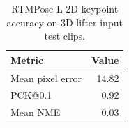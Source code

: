\begin{table}[t]
\centering
\caption{RTMPose-L 2D keypoint accuracy on 3D-lifter input test clips.}
\begin{tabular}{lr}
\toprule
Metric & Value \\
\midrule
Mean pixel error & 14.82 \\
PCK@0.1 & 0.92 \\
Mean NME & 0.03 \\
\bottomrule
\end{tabular}
\end{table}